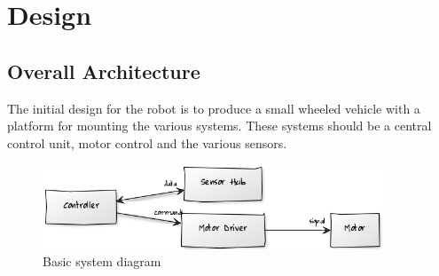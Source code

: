 \chapter{Design}








\section{Overall Architecture}
The initial design for the robot is to produce a small wheeled vehicle with a platform for mounting the various systems.  These systems should be a central control unit, motor control and the various sensors.

\begin{figure}[h]
\centering
        \includegraphics[width=4.0in] {Images/basic-uml.png}
        \caption{Basic system diagram}
        \label{Basic system diagram}
\end{figure}


